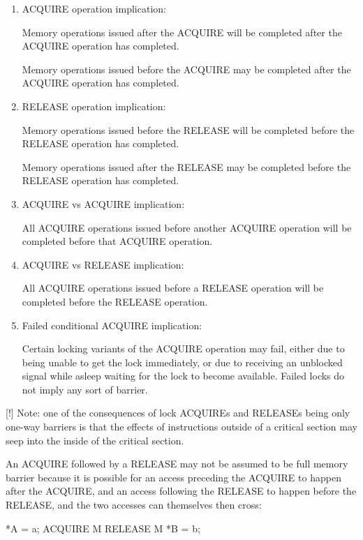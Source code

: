 \begin{enumerate}
 \item
     ACQUIRE operation implication:

     Memory operations issued after the ACQUIRE will be completed after the
     ACQUIRE operation has completed.

     Memory operations issued before the ACQUIRE may be completed after
     the ACQUIRE operation has completed.

 \item
     RELEASE operation implication:

     Memory operations issued before the RELEASE will be completed before the
     RELEASE operation has completed.

     Memory operations issued after the RELEASE may be completed before the
     RELEASE operation has completed.

 \item
     ACQUIRE vs ACQUIRE implication:

     All ACQUIRE operations issued before another ACQUIRE operation will be
     completed before that ACQUIRE operation.

 \item
     ACQUIRE vs RELEASE implication:

     All ACQUIRE operations issued before a RELEASE operation will be
     completed before the RELEASE operation.

 \item
     Failed conditional ACQUIRE implication:

     Certain locking variants of the ACQUIRE operation may fail, either due to
     being unable to get the lock immediately, or due to receiving an unblocked
     signal while asleep waiting for the lock to become available.
     Failed locks do not imply any sort of barrier.
\end{enumerate}

[!] Note: one of the consequences of lock ACQUIREs and RELEASEs being only
one-way barriers is that the effects of instructions outside of a critical
section may seep into the inside of the critical section.

An ACQUIRE followed by a RELEASE may not be assumed to be full memory barrier
because it is possible for an access preceding the ACQUIRE to happen after the
ACQUIRE, and an access following the RELEASE to happen before the RELEASE, and
the two accesses can themselves then cross:

\begin{VerbatimU}
	*A = a;
	ACQUIRE M
	RELEASE M
	*B = b;
\end{VerbatimU}

